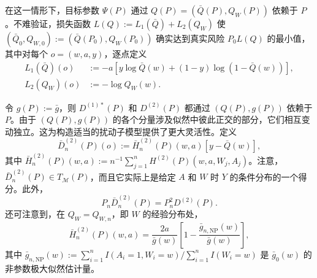 在这一情形下，目标参数 $\Psi(P)$ 通过 $Q(P)=(\bar Q(P),Q_W(P))$ 依赖于 $P$。不难验证，损失函数 $L(Q):=L_1(\bar Q)+L_2(Q_W)$ 使 $(\bar Q_0,Q_{W,0}):=(\bar Q(P_0),Q_W(P_0))$ 确实达到真实风险 $P_0L(Q)$ 的最小值，其中对每个 $o=(w,a,y)$，逐点定义
\[
\begin{aligned}
L_1(\bar Q)(o)&:=-a[y\log\bar Q(w)+(1-y)\log(1-\bar Q(w))],\\
L_2(Q_W)(o)&:=-\log Q_W(w).
\end{aligned}
\]

令 $g(P):=\bar g$，则 $D^{(1)*}(P)$ 和 $D^{(2)}(P)$ 都通过 $(Q(P),g(P))$ 依赖于 $P$。由于 $(Q(P),g(P))$ 的各个分量涉及似然中彼此正交的部分，它们相互变动独立。这为构造适当的扰动子模型提供了更大灵活性。定义
\[
\bar D_n^{(2)}(P)(o):=\bar H_n^{(2)}(P)(w,a)[y-\bar Q(w)],
\]
其中 $\bar H_n^{(2)}(P)(w,a):=n^{-1}\sum_{j=1}^nH^{(2)}(P)(w,a,W_j,A_j)$。注意，$\bar D_n^{(2)}(P)\in T_{\mathcal M}(P)$，而且它实际上是给定 $A$ 和 $W$ 时 $Y$ 的条件分布的一个得分。此外，
\[
P_n\bar D_n^{(2)}(P)=P_n^2D^{(2)}(P).
\]
还可注意到，在 $Q_W=Q_{W,n}$，即 $W$ 的经验分布处，
\[
\bar H_n^{(2)}(P)(w,a)=\frac{2a}{\bar g(w)}
\left[1-\frac{\bar g_{n,\mathrm{NP}}(w)}{\bar g(w)}\right],
\]
其中 $\bar g_{n,\mathrm{NP}}(w):=\sum_{i=1}^nI(A_i=1,W_i=w)/\sum_{i=1}^nI(W_i=w)$ 是 $\bar g_0(w)$ 的非参数极大似然估计量。

